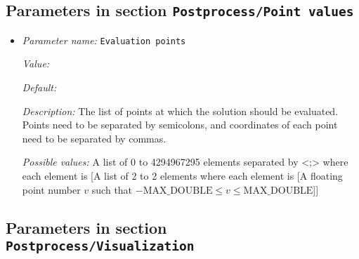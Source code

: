 \subsection{Parameters in section \tt Postprocess/Point values}
\label{parameters:Postprocess/Point_20values}

\begin{itemize}
\item {\it Parameter name:} {\tt Evaluation points}
\label{parameters:Postprocess/Point values/Evaluation points}


{\it Value:} 


{\it Default:} 


{\it Description:} The list of points at which the solution should be evaluated. Points need to be separated by semicolons, and coordinates of each point need to be separated by commas.


{\it Possible values:} A list of 0 to 4294967295 elements separated by <;> where each element is [A list of 2 to 2 elements where each element is [A floating point number $v$ such that $-\text{MAX\_DOUBLE} \leq v \leq \text{MAX\_DOUBLE}$]]
\end{itemize}

\subsection{Parameters in section \tt Postprocess/Visualization}
\label{parameters:Postprocess/Visualization}

